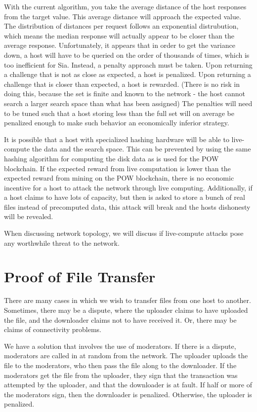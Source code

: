\documentclass[twocolumn]{article}
\begin{document}
\begin{appendices}
With the current algorithm, you take the average distance of the host responses from the target value.
This average distance will approach the expected value.
The distribution of distances per request follows an exponential distrubution, which means the median response will actually appear to be closer than the average response.
Unfortunately, it appears that in order to get the variance down, a host will have to be queried on the order of thousands of times, which is too inefficient for Sia.
Instead, a penalty approach must be taken.
Upon returning a challenge that is not as close as expected, a host is penalized.
Upon returning a challenge that is closer than expected, a host is rewarded.
(There is no risk in doing this, because the set is finite and known to the network - the host cannot search a larger search space than what has been assigned)
The penalties will need to be tuned such that a host storing less than the full set will on average be penalized enough to make such behavior an economically inferior strategy.

It is possible that a host with specialized hashing hardware will be able to live-compute the data and the search space.
This can be prevented by using the same hashing algorithm for computing the disk data as is used for the POW blockchain.
If the expected reward from live computation is lower than the expected reward from mining on the POW blockchain, there is no economic incentive for a host to attack the network through live computing.
Additionally, if a host claims to have lots of capacity, but then is asked to store a bunch of real files instead of precomputed data, this attack will break and the hosts dishonesty will be revealed.

When discussing network topology, we will discuss if live-compute attacks pose any worthwhile threat to the network.

\section{Proof of File Transfer}
There are many cases in which we wish to transfer files from one host to another.
Sometimes, there may be a dispute, where the uploader claims to have uploaded the file, and the downloader claims not to have received it.
Or, there may be claims of connectivity problems.

We have a solution that involves the use of moderators.
If there is a dispute, moderators are called in at random from the network.
The uploader uploads the file to the moderators, who then pass the file along to the downloader.
If the moderators get the file from the uploader, they sign that the transaction was attempted by the uploader, and that the downloader is at fault.
If half or more of the moderators sign, then the downloader is penalized.
Otherwise, the uploader is penalized.


\end{appendices}
\end{document}
